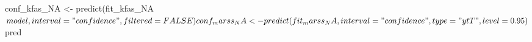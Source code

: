 \begin{Schunk}
\begin{Sinput}
 conf_kfas_NA <-
   predict(fit_kfas_NA$model, interval = "confidence", filtered = FALSE)
 conf_marss_NA <-
   predict(fit_marss_NA, interval = "confidence", type = "ytT", level = 0.95)$pred
\end{Sinput}
\end{Schunk}
